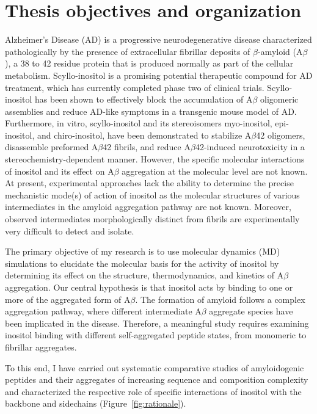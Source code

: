 \section{Thesis objectives and organization}
Alzheimer's Disease (AD) is a progressive neurodegenerative disease characterized pathologically by the presence of extracellular fibrillar deposits of $\beta$-amyloid (A$\beta$), a 38 to 42 residue protein that is produced normally as part of the cellular metabolism. Scyllo-inositol is a promising potential therapeutic compound for AD treatment, which has currently completed phase two of clinical trials. Scyllo-inositol has been shown to effectively block the accumulation of A$\beta$ oligomeric assemblies and reduce AD-like symptoms in a transgenic mouse model of AD. Furthermore, in vitro, scyllo-inositol and its stereoisomers myo-inositol, epi-inositol, and chiro-inositol, have been demonstrated to stabilize A$\beta$42 oligomers, disassemble preformed A$\beta$42 fibrils, and reduce A$\beta$42-induced neurotoxicity in a stereochemistry-dependent manner. However, the specific molecular interactions of inositol and its effect on A$\beta$ aggregation at the molecular level are not known. At present, experimental approaches lack the ability to determine the precise mechanistic mode(s) of action of inositol as the molecular structures of various intermediates in the amyloid aggregation pathway are not known. Moreover, observed intermediates morphologically distinct from fibrils are experimentally very difficult to detect and isolate.

The primary objective of my research is to use molecular dynamics (MD) simulations to elucidate the molecular basis for the activity of inositol by determining its effect on the structure, thermodynamics, and kinetics of A$\beta$ aggregation.  Our central hypothesis is that inositol acts by binding to one or more of the aggregated form of A$\beta$.  The formation of amyloid follows a complex aggregation pathway, where different intermediate A$\beta$ aggregate species have been implicated in the disease. Therefore, a meaningful study requires examining inositol binding with different self-aggregated peptide states, from monomeric to fibrillar aggregates. 

To this end, I have carried out systematic comparative studies of amyloidogenic peptides and their aggregates of increasing sequence and composition complexity and characterized the respective role of specific interactions of inositol with the backbone and sidechains (Figure~\ref{fig:rationale}).

